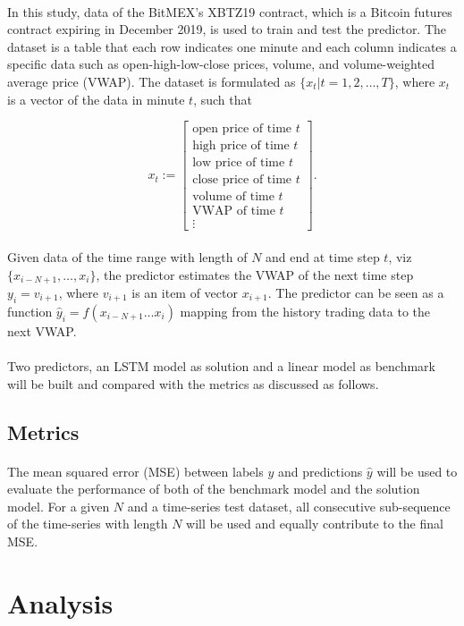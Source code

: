 \documentclass[12pt, letterpaper]{article}
\begin{document}
\paragraph{}
In this study, data of the BitMEX's XBTZ19 contract, which is a Bitcoin futures contract expiring in December 2019, is used to train and test the predictor. The dataset is a table that each row indicates one minute and each column indicates a specific data such as open-high-low-close prices, volume, and volume-weighted average price (VWAP). The dataset is formulated as $\{x_t|t=1,2,\dots,T\}$, where $x_t$ is a vector of the data in minute $t$, such that

\begin{equation*}
    x_t := \begin{bmatrix}
        \text{open price of time }t \\
        \text{high price of time }t \\
        \text{low price of time }t \\
        \text{close price of time }t \\
        \text{volume of time }t \\
        \text{VWAP of time }t \\
        \vdots
    \end{bmatrix}.
\end{equation*}

\paragraph{}
Given data of the time range with length of $N$ and end at time step $t$, viz $\{x_{i-N+1},\dots,x_i\}$, the predictor estimates the VWAP of the next time step $y_i=v_{i+1}$, where $v_{i+1}$ is an item of vector $x_{i+1}$. The predictor can be seen as a function $\hat y_i=f(x_{i-N+1}\dots x_i)$ mapping from the history trading data to the next VWAP.

\paragraph{}
Two predictors, an LSTM model as solution and a linear model as benchmark will be built and compared with the metrics as discussed as follows.

\subsection{Metrics}

\paragraph{}
The mean squared error (MSE) between labels $y$ and predictions $\hat y$ will be used to evaluate the performance of both of the benchmark model and the solution model. For a given $N$ and a time-series test dataset, all consecutive sub-sequence of the time-series with length $N$ will be used and equally contribute to the final MSE.

\section{Analysis} %
\end{document}
